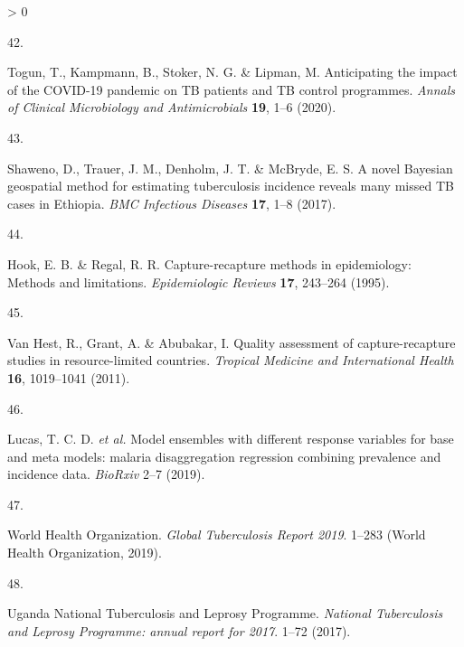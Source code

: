 \documentclass[
]{article}
\newlength{\cslhangindent}
\newlength{\csllabelwidth}
\newenvironment{CSLReferences}[2] %
 {%
  \setlength{\parindent}{0pt}
  \ifodd #1 \everypar{\setlength{\hangindent}{\cslhangindent}}\ignorespaces\fi
  \ifnum #2 > 0
  \setlength{\parskip}{#2\baselineskip}
  \fi
 }%
 {}
\newcommand{\CSLLeftMargin}[1]{\parbox[t]{\csllabelwidth}{#1}}
\newcommand{\CSLRightInline}[1]{\parbox[t]{\linewidth - \csllabelwidth}{#1}\break}
\begin{document}
\begin{CSLReferences}{0}{0}
\leavevmode\hypertarget{ref-Togun2020}{}%
\CSLLeftMargin{42. }
\CSLRightInline{Togun, T., Kampmann, B., Stoker, N. G. \& Lipman, M. {Anticipating the impact of the COVID-19 pandemic on TB patients and TB control programmes}. \emph{Annals of Clinical Microbiology and Antimicrobials} \textbf{19}, 1--6 (2020).}

\leavevmode\hypertarget{ref-Shaweno2017}{}%
\CSLLeftMargin{43. }
\CSLRightInline{Shaweno, D., Trauer, J. M., Denholm, J. T. \& McBryde, E. S. {A novel Bayesian geospatial method for estimating tuberculosis incidence reveals many missed TB cases in Ethiopia}. \emph{BMC Infectious Diseases} \textbf{17}, 1--8 (2017).}

\leavevmode\hypertarget{ref-Hook1995}{}%
\CSLLeftMargin{44. }
\CSLRightInline{Hook, E. B. \& Regal, R. R. {Capture-recapture methods in epidemiology: Methods and limitations}. \emph{Epidemiologic Reviews} \textbf{17}, 243--264 (1995).}

\leavevmode\hypertarget{ref-VanHest2011}{}%
\CSLLeftMargin{45. }
\CSLRightInline{Van Hest, R., Grant, A. \& Abubakar, I. {Quality assessment of capture-recapture studies in resource-limited countries}. \emph{Tropical Medicine and International Health} \textbf{16}, 1019--1041 (2011).}

\leavevmode\hypertarget{ref-Lucas2019}{}%
\CSLLeftMargin{46. }
\CSLRightInline{Lucas, T. C. D. \emph{et al.} {Model ensembles with different response variables for base and meta models: malaria disaggregation regression combining prevalence and incidence data}. \emph{BioRxiv} 2--7 (2019).}

\leavevmode\hypertarget{ref-WorldHealthOrganization2019}{}%
\CSLLeftMargin{47. }
\CSLRightInline{World Health Organization. \emph{{Global Tuberculosis Report 2019}}. 1--283 (World Health Organization, 2019).}

\leavevmode\hypertarget{ref-UgandaNationalTuberculosisandLeprosyProgramme2017b}{}%
\CSLLeftMargin{48. }
\CSLRightInline{Uganda National Tuberculosis and Leprosy Programme. \emph{{National Tuberculosis and Leprosy Programme: annual report for 2017}}. 1--72 (2017).}

\end{CSLReferences}

\newpage
\end{document}
